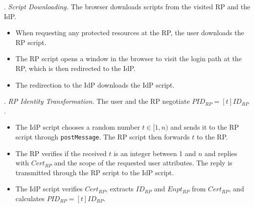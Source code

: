 \vspace{0.85mm}
. {\em Script Downloading.}
The browser downloads scripts from the visited RP and the IdP.
\vspace{-\topsep}
\begin{itemize}
\setlength{\topsep}{0pt}
\setlength{\partopsep}{0pt}
\setlength{\itemsep}{0pt}
\setlength{\parsep}{0pt}
\setlength{\parskip}{0pt}
\item[1.1]
When requesting any protected resources at the RP, the user downloads the RP script.
\item[1.2]
The RP script opens a window in the browser to visit the login path at the RP, which is then redirected to the IdP.
\item[1.3]
The redirection to the IdP downloads the IdP script.
\end{itemize}



. {\em RP Identity Transformation.}
The user and the RP negotiate $PID_{RP} = [t]{ID_{RP}}$.
\vspace{-\topsep}
\begin{itemize}
\setlength{\topsep}{0pt}
\setlength{\partopsep}{0pt}
\setlength{\itemsep}{0pt}
\setlength{\parsep}{0pt}
\setlength{\parskip}{0pt}
\item[2.1] The IdP script chooses a random number $t \in [1, n)$ and sends it to the RP script through \verb+postMessage+. The RP script then forwards $t$ to the RP.
\item[2.2] The RP verifies if the received $t$ is an integer between 1 and $n$ and
replies with $Cert_{RP}$ and the scope of the requested user attributes. The reply is transmitted through the RP script to the IdP script.  %
\item[2.3] The IdP script verifies $Cert_{RP}$, extracts $ID_{RP}$ and $Enpt_{RP}$ from $Cert_{RP}$, and calculates $PID_{RP}=[t]{ID_{RP}}$.

\end{itemize}


